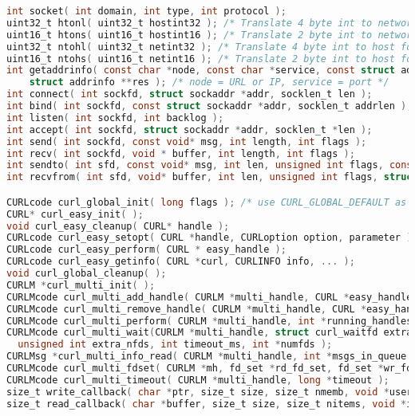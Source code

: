 \documentclass[legalpaper,10pt]{article}
\begin{document}
\begin{lstlisting}[language=C]
int socket( int domain, int type, int protocol );
uint32_t htonl( uint32_t hostint32 ); /* Translate 4 byte int to network format */ 
uint16_t htons( uint16_t hostint16 ); /* Translate 2 byte int to network format */ 
uint32_t ntohl( uint32_t netint32 ); /* Translate 4 byte int to host format */ 
uint16_t ntohs( uint16_t netint16 ); /* Translate 2 byte int to host format */
int getaddrinfo( const char *node, const char *service, const struct addrinfo *hints, 
    struct addrinfo **res ); /* node = URL or IP, service = port */
int connect( int sockfd, struct sockaddr *addr, socklen_t len );
int bind( int sockfd, const struct sockaddr *addr, socklen_t addrlen );
int listen( int sockfd, int backlog );
int accept( int sockfd, struct sockaddr *addr, socklen_t *len );
int send( int sockfd, const void* msg, int length, int flags );
int recv( int sockfd, void * buffer, int length, int flags );
int sendto( int sfd, const void* msg, int len, unsigned int flags, const struct sockaddr* to, socklen_t token );
int recvfrom( int sfd, void* buffer, int len, unsigned int flags, struct sockaddr* from, int* fromlength );

CURLcode curl_global_init( long flags ); /* use CURL_GLOBAL_DEFAULT as flags */
CURL* curl_easy_init( );
void curl_easy_cleanup( CURL* handle );
CURLcode curl_easy_setopt( CURL *handle, CURLoption option, parameter ); /* See table below */
CURLcode curl_easy_perform( CURL * easy_handle );
CURLcode curl_easy_getinfo( CURL *curl, CURLINFO info, ... );
void curl_global_cleanup( );
CURLM *curl_multi_init( );
CURLMcode curl_multi_add_handle( CURLM *multi_handle, CURL *easy_handle );
CURLMcode curl_multi_remove_handle( CURLM *multi_handle, CURL *easy_handle );
CURLMcode curl_multi_perform( CURLM *multi_handle, int *running_handles );
CURLMcode curl_multi_wait(CURLM *multi_handle, struct curl_waitfd extra_fds[],
  unsigned int extra_nfds, int timeout_ms, int *numfds );
CURLMsg *curl_multi_info_read( CURLM *multi_handle, int *msgs_in_queue );
CURLMcode curl_multi_fdset( CURLM *mh, fd_set *rd_fd_set, fd_set *wr_fd_set, fd_set *ex_fd_set, int *max_fd );
CURLMcode curl_multi_timeout( CURLM *multi_handle, long *timeout );
size_t write_callback( char *ptr, size_t size, size_t nmemb, void *userdata );
size_t read_callback( char *buffer, size_t size, size_t nitems, void *inputdata );
\end{lstlisting}
\end{document}
